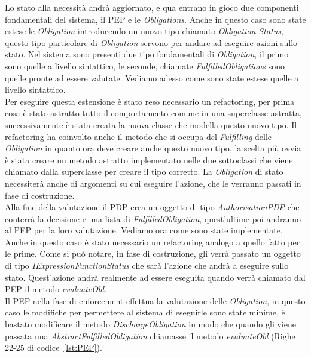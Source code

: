Lo stato alla necessità andrà aggiornato, e qua entrano in gioco due componenti fondamentali del sistema, il PEP e le \textit{Obligations}. 
Anche in questo caso sono state estese le \textit{Obligation} introducendo un nuovo tipo chiamato \textit{Obligation Status}, questo tipo particolare di \textit{Obligation} servono per andare ad eseguire azioni sullo stato.
Nel sistema sono presenti due tipo fondamentali di \textit{Obligation}, il primo sono quelle a livello sintattico, le seconde, chiamate \textit{FulfilledObligations} sono quelle pronte ad essere valutate. Vediamo adesso come sono state estese quelle a livello sintattico.\\
Per eseguire questa estensione è stato reso necessario un refactoring, per prima cosa è stato astratto tutto il comportamento comune in una superclasse astratta, successivamente è stata creata la nuova classe che modella questo nuovo tipo.
Il refactoring ha coinvolto anche il metodo che si occupa del \textit{Fulfilling} delle \textit{Obligation} in quanto ora deve creare anche questo nuovo tipo, la scelta più ovvia è stata creare un metodo astratto implementato nelle due sottoclassi che viene chiamato dalla superclasse per creare il tipo corretto.
La \textit{Obligation} di stato necessiterà anche di argomenti su cui eseguire l'azione, che le verranno passati in fase di costruzione.\\
Alla fine della valutazione il PDP crea un oggetto di tipo \textit{AuthorisationPDP} che conterrà la decisione e una lista di \textit{FulfilledObligation}, quest'ultime poi andranno al PEP per la loro valutazione. Vediamo ora come sono state implementate.\\
Anche in questo caso è stato necessario un refactoring analogo a quello fatto per le prime.
Come si può notare, in fase di costruzione, gli verrà passato un oggetto di tipo \textit{IExpressionFunctionStatus} che sarà l'azione che andrà a eseguire sullo stato. Quest'azione andrà realmente ad essere eseguita quando verrà chiamato dal PEP il metodo \textit{evaluateObl}.\\
Il PEP nella fase di enforcement effettua la valutazione delle \textit{Obligation}, in questo caso le modifiche per permettere al sistema di eseguirle sono state minime, è bastato modificare il metodo \textit{DischargeObligation} in modo che quando gli viene passata una \textit{AbstractFulfilledObligation} chiamasse il metodo \textit{evaluateObl} (Righe 22-25 di codice~\ref{lst:PEP}).


